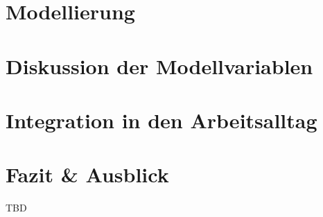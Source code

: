 \documentclass[%
pdftex,
oneside,			%
11pt,				%
parskip=half,		%
headheight = 12pt,	%
headsepline,		%
footsepline,		%
footheight = 16pt,	%
abstracton,		%
DIV=calc,		%
BCOR=8mm,		%
headinclude=false,	%
footinclude=false,	%
listof=totoc,		%
toc=bibliography,	%
]{scrreprt}	%
\begin{document}
\chapter{Modellierung}


\chapter{Diskussion der Modellvariablen}


\chapter{Integration in den Arbeitsalltag}


\chapter{Fazit \& Ausblick}

    TBD




\cleardoublepage

\ifx\VAlterZitierstil\VTrueValue
    \printbibliography
\else
    
\fi
\end{document}
